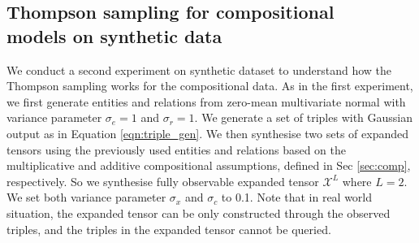 \subsection{Thompson sampling for compositional\\ models on synthetic data}

We conduct a second experiment on synthetic dataset to understand how
the Thompson sampling works for the compositional data. 
As in the first experiment, we first generate entities and relations from 
zero-mean multivariate normal with variance parameter $\sigma_e = 1$ and 
$\sigma_r=1$. We generate a set of triples with Gaussian output as in 
Equation \ref{eqn:triple_gen}. We then synthesise two sets of expanded tensors 
using the previously used entities and relations based on the multiplicative 
and additive compositional assumptions, defined in Sec \ref{sec:comp}, 
respectively. So we synthesise fully observable expanded tensor $\mathcal{X}^L$ 
where $L=2$. We set both variance parameter $\sigma_x$ and $\sigma_c$ to 0.1. Note that in real world situation, the expanded tensor can be only constructed through the observed triples, and the triples in the expanded tensor cannot be queried.

